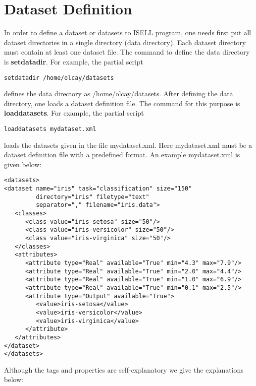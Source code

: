 \documentclass[a4paper,12pt]{book}
\begin{document}
\chapter{Dataset Definition}
\label{sec-dataset}
In order to define a dataset or datasets to ISELL program, one needs first put all dataset directories in a single directory (data directory). Each dataset directory must contain at least one dataset file. The command to define the data directory is {\bf setdatadir}. For example, the partial script
\begin{verbatim}
setdatadir /home/olcay/datasets
\end{verbatim}
defines the data directory as /home/olcay/datasets. After defining the data directory, one loads a dataset definition file. The command for this purpose is {\bf loaddatasets}. For example, the partial script
\begin{verbatim}
loaddatasets mydataset.xml
\end{verbatim}
loads the datasets given in the file mydataset.xml. Here mydataset.xml must be a dataset definition file with a predefined format. An example mydataset.xml is given below:
\begin{verbatim}
<datasets>
<dataset name="iris" task="classification" size="150" 
         directory="iris" filetype="text" 
         separator="," filename="iris.data">
   <classes>
      <class value="iris-setosa" size="50"/>
      <class value="iris-versicolor" size="50"/>
      <class value="iris-virginica" size="50"/>
   </classes>
   <attributes>
      <attribute type="Real" available="True" min="4.3" max="7.9"/>
      <attribute type="Real" available="True" min="2.0" max="4.4"/>
      <attribute type="Real" available="True" min="1.0" max="6.9"/>
      <attribute type="Real" available="True" min="0.1" max="2.5"/>
      <attribute type="Output" available="True">
         <value>iris-setosa</value>
         <value>iris-versicolor</value>
         <value>iris-virginica</value>
      </attribute>
   </attributes>
</dataset>
</datasets>
\end{verbatim}
Although the tags and properties are self-explanatory we give the explanations below:
\end{document}
